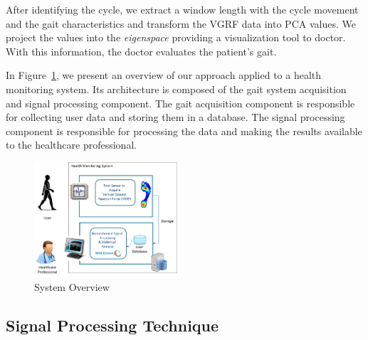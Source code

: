 \documentclass[10pt, conference, compsocconf]{IEEEtran}
\begin{document}
After identifying the cycle, we extract a window length with the cycle movement and the gait characteristics and transform the VGRF data into PCA values. We project the values into the \textit{eigenspace} providing a visualization tool to doctor. With this information, the doctor evaluates the patient's gait.

In Figure~\ref{img:sysarch}, we present an overview of our approach applied to a health monitoring system. Its architecture is composed of the gait system acquisition and signal processing component. The gait acquisition component is responsible for collecting user data and storing them in a database. The signal processing component is responsible for processing the data and making the results available to the healthcare professional.
%
%

\begin{figure}[!htb]
	\centering
	\includegraphics[width=0.475\textwidth]{img/systemoverview.png}
	\caption{System Overview}
	\label{img:sysarch}
\end{figure}

\subsection{Signal Processing Technique}


\end{document}
